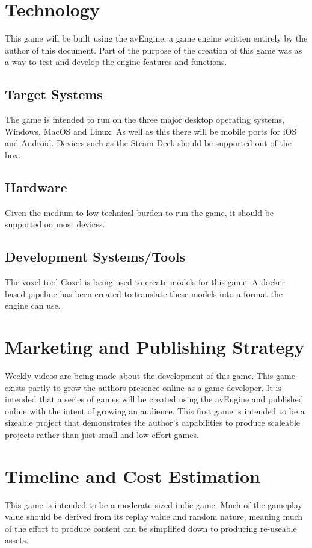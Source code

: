 \documentclass[a4paper]{scrreprt}
\begin{document}
\chapter{Technology}
This game will be built using the avEngine, a game engine written entirely by the author of this document.
Part of the purpose of the creation of this game was as a way to test and develop the engine features and functions.

\section{Target Systems}
The game is intended to run on the three major desktop operating systems, Windows, MacOS and Linux.
As well as this there will be mobile ports for iOS and Android.
Devices such as the Steam Deck should be supported out of the box.

\section{Hardware}
Given the medium to low technical burden to run the game, it should be supported on most devices.

\section{Development Systems/Tools}
The voxel tool Goxel is being used to create models for this game.
A docker based pipeline has been created to translate these models into a format the engine can use.


\chapter{Marketing and Publishing Strategy}
Weekly videos are being made about the development of this game.
This game exists partly to grow the authors presence online as a game developer.
It is intended that a series of games will be created using the avEngine and published online with the intent of growing an audience.
This first game is intended to be a sizeable project that demonstrates the author's capabilities to produce scaleable projects rather than just small and low effort games.

\chapter{Timeline and Cost Estimation}

This game is intended to be a moderate sized indie game.
Much of the gameplay value should be derived from its replay value and random nature, meaning much of the effort to produce content can be simplified down to producing re-useable assets.
\end{document}
